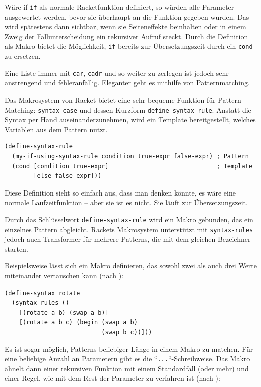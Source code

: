 Wäre if \texttt{if} als normale Racketfunktion definiert, so würden alle Parameter ausgewertet werden, bevor sie überhaupt an die Funktion gegeben wurden. Das wird spätestens dann sichtbar, wenn sie Seiteneffekte beinhalten oder in einem Zweig der Fallunterscheidung ein rekursiver Aufruf steckt. Durch die Definition als Makro bietet die Möglichkeit, \texttt{if} bereits zur Übersetzungszeit durch ein \texttt{cond} zu ersetzen.


Eine Liste immer mit \texttt{car}, \texttt{cadr} und so weiter zu zerlegen ist jedoch sehr anstrengend und fehleranfällig. Eleganter geht es mithilfe von Patternmatching. %


Das Makrosystem von Racket bietet eine sehr bequeme Funktion für Pattern Matching: \texttt{syntax-case} und dessen Kurzform \texttt{define-syntax-rule}. Anstatt die Syntax per Hand auseinanderzunehmen, wird ein Template bereitgestellt, welches Variablen aus dem Pattern nutzt.

\begin{lstlisting}
(define-syntax-rule 
  (my-if-using-syntax-rule condition true-expr false-expr) ; Pattern
  (cond [condition true-expr]                              ; Template
        [else false-expr]))
\end{lstlisting}

Diese Definition sieht so einfach aus, dass man denken könnte, es wäre eine normale Laufzeitfunktion -- aber sie ist es nicht. Sie läuft zur Übersetzungszeit. 


Durch das Schlüsselwort \texttt{define-syntax-rule} wird ein Makro gebunden, das ein einzelnes Pattern abgleicht. Rackets Makrosystem unterstützt mit \texttt{syntax-rules} jedoch auch Transformer für mehrere Patterns, die mit dem gleichen Bezeichner starten.

Beispielsweise lässt sich ein Makro definieren, das sowohl zwei als auch drei Werte miteinander vertauschen kann (nach \cite{racketguide-macros}):

\begin{lstlisting}
(define-syntax rotate
  (syntax-rules ()
    [(rotate a b) (swap a b)]
    [(rotate a b c) (begin (swap a b)
                           (swap b c))]))
\end{lstlisting}

Es ist sogar möglich, Patterns beliebiger Länge in einem Makro zu matchen. Für eine beliebige Anzahl an Parametern gibt es die ``\texttt{...}``-Schreibweise. Das Makro ähnelt dann einer rekursiven Funktion mit einem Standardfall (oder mehr) und einer Regel, wie mit dem Rest der Parameter zu verfahren ist (nach \cite{racketguide-macros}):

